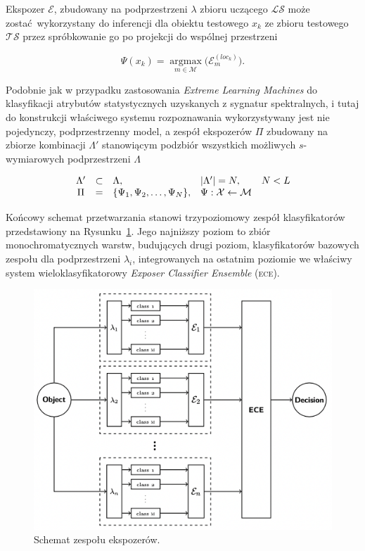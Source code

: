 Ekspozer $\mathcal{E}$, zbudowany na podprzestrzeni $\lambda$ zbioru uczącego $\mathcal{LS}$ może zostać wykorzystany do inferencji dla obiektu testowego $x_k$ ze zbioru testowego $\mathcal{TS}$ przez spróbkowanie go po projekcji do wspólnej przestrzeni

\begin{equation}
	\Psi(x_k) = \mathop{argmax}\limits_{m \in \mathcal{M}}\Big(\mathcal{E}^{(loc_k)}_m \Big).
\end{equation}

Podobnie jak w przypadku zastosowania \emph{Extreme Learning Machines} do klasyfikacji atrybutów statystycznych uzyskanych z sygnatur spektralnych, i tutaj do konstrukcji właściwego systemu rozpoznawania wykorzystywany jest nie pojedynczy, podprzestrzenny model, a zespół ekspozerów $\Pi$ zbudowany na zbiorze kombinacji $\Lambda'$ stanowiącym podzbiór wszystkich możliwych $s$-wymiarowych podprzestrzeni $\Lambda$

\begin{equation}
	\begin{array}[b]{cllll}
		\Lambda' & \subset & \Lambda, & \vert\Lambda'\vert = N, & N < L \\
		\Pi      & =       & \{\Psi_1, \Psi_2, \ldots,\Psi_N \},& \Psi : \mathcal{X} \leftarrow \mathcal{M}
	\end{array}
\end{equation}

Końcowy schemat przetwarzania stanowi trzypoziomowy zespół klasyfikatorów przedstawiony na Rysunku~\ref{fig:ece}. Jego najniższy poziom to zbiór monochromatycznych warstw, budujących drugi poziom, klasyfikatorów bazowych zespołu dla podprzestrzeni $\lambda_i$, integrowanych na ostatnim poziomie we właściwy system wieloklasyfikatorowy \emph{Exposer Classifier Ensemble} (\textsc{ece}).

\begin{figure}[!htb]
	\centering
	\includegraphics[width=\textwidth]{figures/ece}
	\caption{Schemat zespołu ekspozerów.}\label{fig:ece}
\end{figure}


